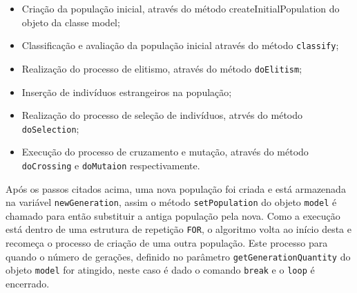 \begin{itemize}
	\begin{itemize}
	  \item	Criação da população inicial, através do método createInitialPopulation
	  do objeto da classe model;
	  
	  \item Classificação e avaliação da população inicial através do método
	  \texttt{classify};
	  
	  \item Realização do processo de elitismo, através do método
	  \texttt{doElitism};
	  
	  \item Inserção de indivíduos estrangeiros na população;
	  
	  \item Realização do processo de seleção de indivíduos, atrvés do método
	  \texttt{doSelection};
	  
	  \item Execução do processo de cruzamento e mutação, através do método
	  \texttt{doCrossing} e \texttt{doMutaion} respectivamente.
	  
	  	  
	\end{itemize}
	
	\par Após os passos citados acima, uma nova população foi criada e está
	armazenada na variável \texttt{newGeneration}, assim o método
	\texttt{setPopulation} do objeto \texttt{model} é chamado para então substituir
	a antiga população pela nova. Como a execução está dentro de uma estrutura de repetição
	\texttt{FOR}, o algoritmo volta ao início desta e recomeça o processo de
	criação de uma outra população. Este processo para quando o número de gerações, 
	definido no parâmetro \texttt{getGenerationQuantity} do objeto \texttt{model}
	for atingido, neste caso é dado o comando \texttt{break} e o \texttt{loop} é encerrado.
	
% 	
	
	
	
\end{itemize}

